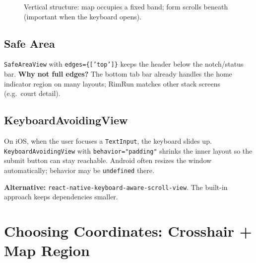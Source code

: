 \documentclass[11pt,a4paper]{article}
\begin{document}
\begin{figure}[h]
\centering
{}
\caption{Vertical structure: map occupies a fixed band; form scrolls beneath (important when the keyboard opens).}
\end{figure}

\subsection{Safe Area}

\texttt{SafeAreaView} with \texttt{edges=\{['top']\}} keeps the header below the notch/status bar. \textbf{Why not full edges?} The bottom tab bar already handles the home indicator region on many layouts; RimRun matches other stack screens (e.g.\ court detail).

\subsection{KeyboardAvoidingView}

On iOS, when the user focuses a \texttt{TextInput}, the keyboard slides up. \texttt{KeyboardAvoidingView} with \texttt{behavior="padding"} shrinks the inner layout so the submit button can stay reachable. Android often resizes the window automatically; behavior may be \texttt{undefined} there.

\textbf{Alternative:} \texttt{react-native-keyboard-aware-scroll-view}. The built-in approach keeps dependencies smaller.

\section{Choosing Coordinates: Crosshair + Map Region}
\end{document}
